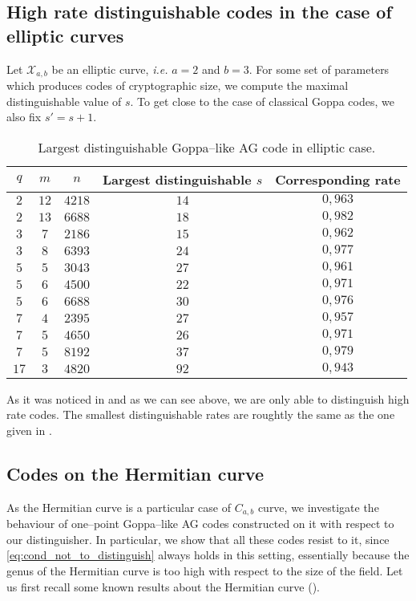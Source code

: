\documentclass[peerreview]{IEEEtran}
\theoremstyle{plain}
\theoremstyle{definition}
\theoremstyle{remark}
\newcommand{\calX}{\mathcal{X}}
\begin{document}
	\subsection{High rate distinguishable codes in the case of elliptic curves}
	\noindent
	Let $\calX_{a,b}$ be an elliptic curve, \emph{i.e.} $a=2$ and $b=3$. For some set of parameters which produces codes of cryptographic size, we compute the maximal distinguishable value of $s$. To get close to the case of classical Goppa codes, we also fix $s'=s+1$.
	\begin{table}[h]
		\begin{center}
			\caption{Largest distinguishable Goppa--like AG code in elliptic case.}
			\begin{tabular}{|c|c|c||c|c|}
				\hline
				$q$ & $m$ & $n$ & Largest distinguishable $s$ & Corresponding rate\\
				\hline \hline
				$2$ & $12$ & $4218$ & $14$ & $0,963$ \\
				\hline 
				$2$ & $13$ & $6688$ & $18$ & $0,982$  \\
				\hline \hline
				$3$ & $7$ & $2186$ & $15$ & $0,962$ \\
				\hline
				$3$ & $8$ & $6393$ & $24$ & $0,977$ \\
				\hline \hline
				$5$ & $5$ & $3043$ & $27$ & $0,961$  \\
				\hline
				$5$ & $6$ & $4500$ & $22$ & $0,971$ \\
				\hline
				$5$  & $6$ & $6688$ & $30$ & $0,976$ \\
				\hline \hline
				$7$ & $4$ & $2395$ & $27$ & $0,957$ \\
				\hline
				$7$ & $5$ & $4650$ & $26$ & $0,971$ \\
				\hline
				$7$ & $5$ & $8192$ & $37$ & $0,979$ \\
				\hline \hline
				$17$ & $3$ & $4820$ & $92$ & $0,943$ \\
				\hline
			\end{tabular}
		\end{center}
	\end{table}
	
	As it was noticed in \cite{MT21} and as we can see above, we are only able to distinguish high rate codes. The smallest distinguishable rates are roughtly the same as the one given in \cite{MT21}. 
	
	\subsection{Codes on the Hermitian curve}
	\noindent
	As the Hermitian curve is a particular case of $C_{a,b}$ curve, we investigate the behaviour of one--point Goppa--like AG codes constructed on it with respect to our distinguisher.
	In particular, we show that all these codes resist to it, since  \eqref{eq:cond_not_to_distinguish} always holds in this setting, essentially because the genus of the Hermitian curve is too high with respect to the size of the field. Let us first recall some known results about the Hermitian curve (\cite{Sti09}). 
	
\end{document}
